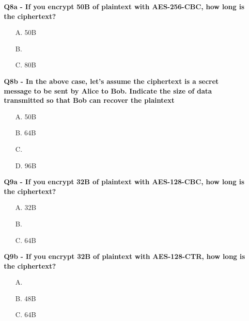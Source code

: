 \textbf{Q8a - If you encrypt 50B of plaintext with AES-256-CBC, how long is the ciphertext?}
\begin{enumerate}
    \item[A.] 50B
    \item[B.] 
    \item[C.] 80B
\end{enumerate}


\textbf{Q8b - In the above case, let’s assume the ciphertext is a secret message to be sent by Alice to Bob. Indicate the size of data transmitted so that Bob can recover the plaintext}
\begin{enumerate}
    \item[A.] 50B
    \item[B.] 64B
    \item[C.] 
    \item[D.] 96B
\end{enumerate}

\textbf{Q9a - If you encrypt 32B of plaintext with AES-128-CBC, how long is the ciphertext?}
\begin{enumerate}
    \item[A.] 32B
    \item[B.] 
    \item[C.] 64B
\end{enumerate}

\textbf{Q9b - If you encrypt 32B of plaintext with AES-128-CTR, how long is the ciphertext?}
\begin{enumerate}
    \item[A.] 
    \item[B.] 48B
    \item[C.] 64B
\end{enumerate}

